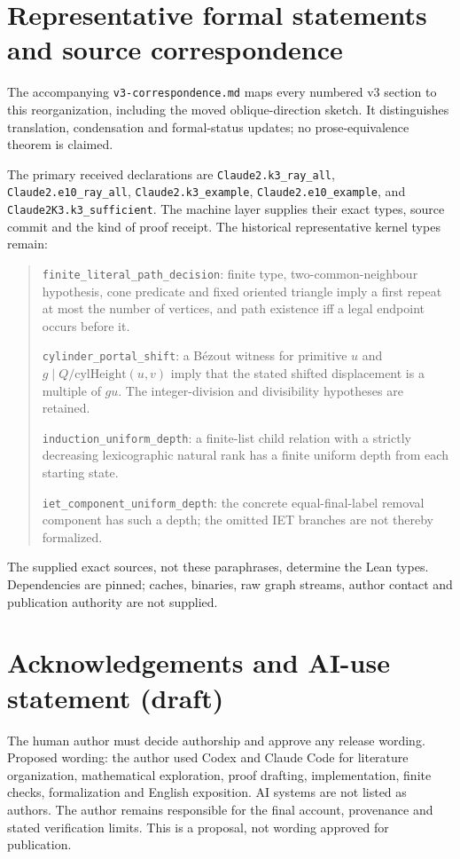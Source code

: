 \documentclass[11pt]{amsart}
\newcommand{\record}[1]{\nolinkurl{#1}}
\theoremstyle{definition}\newtheorem{definition}{Definition}
\begin{document}
\section{Representative formal statements and source correspondence}\label{app:correspondence}
The accompanying \record{v3-correspondence.md} maps every numbered v3
section to this reorganization, including the moved oblique-direction
sketch. It distinguishes translation, condensation and formal-status
updates; no prose-equivalence theorem is claimed.

The primary received declarations are
\record{Claude2.k3_ray_all}, \record{Claude2.e10_ray_all},
\record{Claude2.k3_example}, \record{Claude2.e10_example}, and
\record{Claude2K3.k3_sufficient}. The machine layer supplies their exact
types, source commit and the kind of proof receipt. The historical
representative kernel types remain:
\begin{quote}\small
\record{finite_literal_path_decision}: finite type, two-common-neighbour
hypothesis, cone predicate and fixed oriented triangle imply a first
repeat at most the number of vertices, and path existence iff a legal
endpoint occurs before it.\par
\record{cylinder_portal_shift}: a B\'ezout witness for primitive $u$
and $g\mid Q/\mathrm{cylHeight}(u,v)$ imply that the stated shifted
displacement is a multiple of $gu$. The integer-division and
divisibility hypotheses are retained.\par
\record{induction_uniform_depth}: a finite-list child relation with a
strictly decreasing lexicographic natural rank has a finite uniform
depth from each starting state.\par
\record{iet_component_uniform_depth}: the concrete equal-final-label
removal component has such a depth; the omitted IET branches are not
thereby formalized.
\end{quote}
The supplied exact sources, not these paraphrases, determine the Lean
types. Dependencies are pinned; caches, binaries, raw graph streams,
author contact and publication authority are not supplied.

\section*{Acknowledgements and AI-use statement (draft)}
The human author must decide authorship and approve any release wording.
Proposed wording: the author used Codex and Claude Code for literature
organization, mathematical exploration, proof drafting, implementation,
finite checks, formalization and English exposition. AI systems are not
listed as authors. The author remains responsible for the final account,
provenance and stated verification limits. This is a proposal, not
wording approved for publication.
\end{document}
